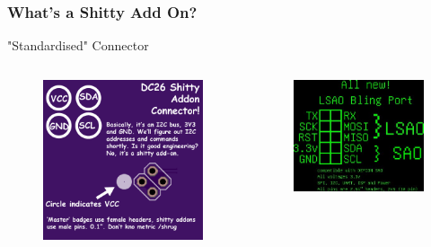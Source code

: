 \documentclass[t]{beamer}
\begin{document}
\begin{frame}
\frametitle{What's a Shitty Add On?}
"Standardised" Connector
\begin{columns}[c]
	\begin{figure}
		\includegraphics[width=0.9\linewidth]{sao.png}
	\end{figure}
	
	\begin{figure}
		\includegraphics[width=0.9\linewidth]{LSAO.jpg}
	\end{figure}
	

\end{columns}
\end{frame}
\end{document}
